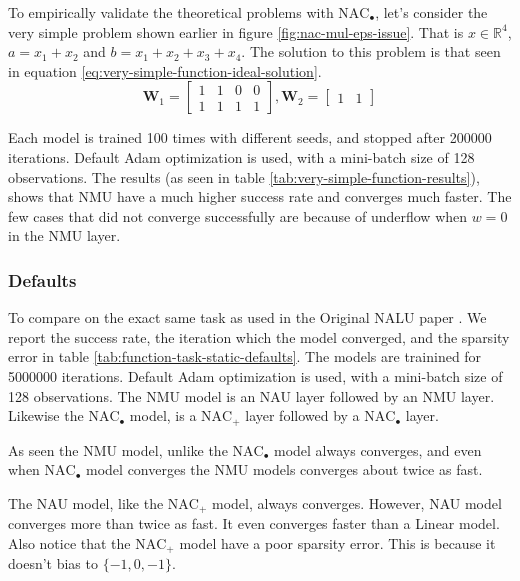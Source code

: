 To empirically validate the theoretical problems with $\mathrm{NAC}_{\bullet}$, let's consider the very simple problem shown earlier in figure \ref{fig:nac-mul-eps-issue}. That is $x \in \mathbb{R}^4$, $a = x_1 + x_2$ and $b = x_1 + x_2 + x_3 + x_4$. The solution to this problem is that seen in equation \ref{eq:very-simple-function-ideal-solution}.
\begin{equation}
    \mathbf{W}_1 = \begin{bmatrix}
    1 & 1 & 0 & 0 \\
    1 & 1 & 1 & 1
    \end{bmatrix}, \mathbf{W}_2 = \begin{bmatrix}
    1 & 1
    \end{bmatrix}
    \label{eq:very-simple-function-ideal-solution}
\end{equation}

Each model is trained 100 times with different seeds, and stopped after 200000 iterations. Default Adam optimization is used, with a mini-batch size of 128 observations. The results (as seen in table \ref{tab:very-simple-function-results}), shows that NMU have a much higher success rate and converges much faster. The few cases that did not converge successfully are because of underflow when $w = 0$ in the NMU layer.



\subsubsection{Defaults}

To compare on the exact same task as used in the Original NALU paper \cite{trask-nalu}. We report the success rate, the iteration which the model converged, and the sparsity error in table \ref{tab:function-task-static-defaults}. The models are trainined for 5000000 iterations. Default Adam optimization is used, with a mini-batch size of 128 observations. The NMU model is an NAU layer followed by an NMU layer. Likewise the  $\mathrm{NAC}_{\bullet}$ model, is a $\mathrm{NAC}_{+}$ layer followed by a $\mathrm{NAC}_{\bullet}$ layer.

As seen the NMU model, unlike the $\mathrm{NAC}_{\bullet}$ model always converges, and even when $\mathrm{NAC}_{\bullet}$ model converges the NMU models converges about twice as fast.

The NAU model, like the $\mathrm{NAC}_{+}$ model, always converges. However, NAU model converges more than twice as fast. It even converges faster than a Linear model. Also notice that the $\mathrm{NAC}_{+}$ model have a poor sparsity error. This is because it doesn't bias to $\{-1, 0, -1\}$.

